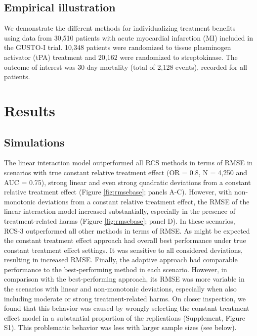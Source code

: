 \documentclass[]{elsarticle} %
\begin{document}
\hypertarget{empirical-illustration}{%
\subsection{Empirical illustration}\label{empirical-illustration}}

We demonstrate the different methods for individualizing treatment
benefits using data from 30,510 patients with acute myocardial
infarction (MI) included in the GUSTO-I trial. 10,348 patients were
randomized to tissue plasminogen activator (tPA) treatment and 20,162
were randomized to streptokinase. The outcome of interest was 30-day
mortality (total of 2,128 events), recorded for all patients.

\hypertarget{results}{%
\section{Results}\label{results}}

\hypertarget{simulations}{%
\subsection{Simulations}\label{simulations}}

The linear interaction model outperformed all RCS methods in terms of
RMSE in scenarios with true constant relative treatment effect (OR =
0.8, N = 4,250 and AUC = 0.75), strong linear and even strong quadratic
deviations from a constant relative treatment effect (Figure
\ref{fig:rmsebase}; panels A-C). However, with non-monotonic deviations
from a constant relative treatment effect, the RMSE of the linear
interaction model increased substantially, especially in the presence of
treatment-related harms (Figure \ref{fig:rmsebase}; panel D). In these
scenarios, RCS-3 outperformed all other methods in terms of RMSE. As
might be expected the constant treatment effect approach had overall
best performance under true constant treatment effect settings. It was
sensitive to all considered deviations, resulting in increased RMSE.
Finally, the adaptive approach had comparable performance to the
best-performing method in each scenario. However, in comparison with the
best-performing approach, its RMSE was more variable in the scenarios
with linear and non-monotonic deviations, especially when also including
moderate or strong treatment-related harms. On closer inspection, we
found that this behavior was caused by wrongly selecting the constant
treatment effect model in a substantial proportion of the replications
(Supplement, Figure S1). This problematic behavior was less with larger
sample sizes (see below).
\end{document}

